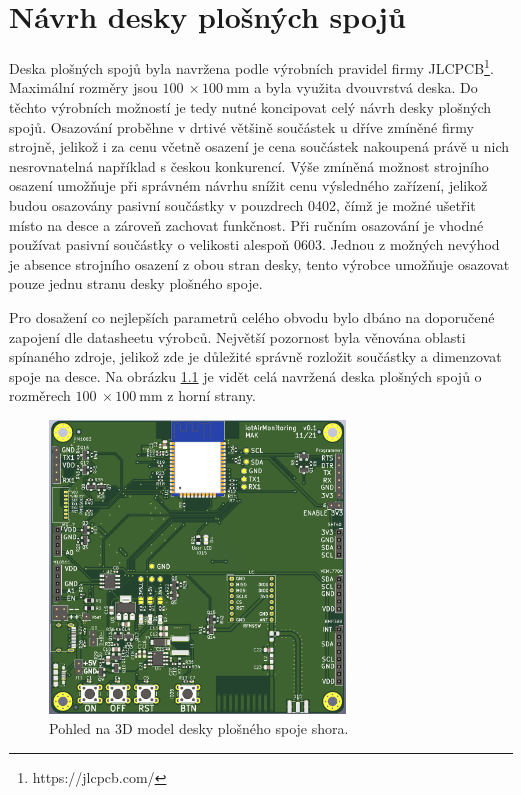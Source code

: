 \chapter{Návrh desky plošných spojů}

Deska plošných spojů byla navržena podle výrobních pravidel firmy JLCPCB\footnote{https://jlcpcb.com/}. Maximální rozměry jsou $\SI{100}{}\times \SI{100}{\milli\metre}$ a byla využita dvouvrstvá deska. Do těchto výrobních možností je tedy nutné koncipovat celý návrh desky plošných spojů. Osazování proběhne v drtivé většině součástek u dříve zmíněné firmy strojně, jelikož i za cenu včetně osazení je cena součástek nakoupená právě u nich nesrovnatelná například s českou konkurencí. Výše zmíněná možnost strojního osazení umožňuje při správném návrhu snížit cenu výsledného zařízení, jelikož budou osazovány pasivní součástky v pouzdrech 0402, čímž je možné ušetřit místo na desce a zároveň zachovat funkčnost. Při ručním osazování je vhodné používat pasivní součástky o velikosti alespoň 0603. Jednou z možných nevýhod je absence strojního osazení z obou stran desky, tento výrobce umožňuje osazovat pouze jednu stranu desky plošného spoje.

Pro dosažení co nejlepších parametrů celého obvodu bylo dbáno na doporučené zapojení dle datasheetu výrobců. Největší pozornost byla věnována oblasti spínaného zdroje, jelikož zde je důležité správně rozložit součástky a dimenzovat spoje na desce. Na obrázku \ref{fig_PCB-top} je vidět celá navržená deska plošných spojů o rozměrech $\SI{100}{}\times \SI{100}{\milli\metre}$ z horní strany.

\begin{figure}[h]
    \centering
    \includegraphics[width=0.7\textwidth]{obrazky/PCB_top.png}
    \caption{Pohled na 3D model desky plošného spoje shora.}
    \label{fig_PCB-top}
\end{figure}